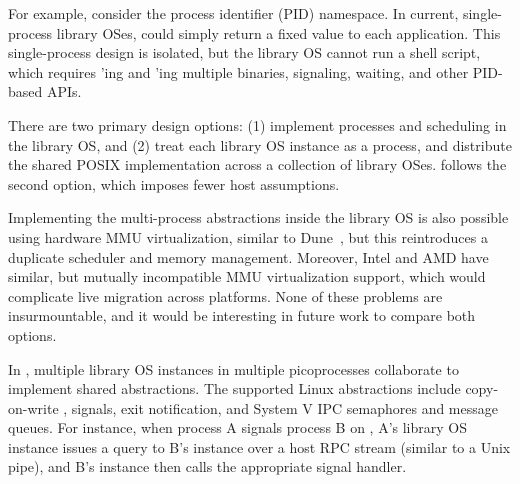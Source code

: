 
For example, consider the process identifier (PID) namespace. In current, single-process library OSes,  could simply return a fixed value to each application.
This single-process design is isolated, but the library OS cannot run a shell script, which requires 'ing and 'ing multiple binaries, signaling, waiting, and other PID-based APIs.

\vspace{5pt}
There are two primary design options: (1) implement processes and scheduling in 
the library OS, and (2) treat each library OS instance as a process, and distribute the shared POSIX implementation across a collection of library OSes.
\graphene{} follows the second option, which imposes fewer host assumptions.

Implementing the multi-process abstractions
inside the library OS is also possible using 
hardware MMU virtualization, similar to Dune~\cite{belay12dune},
but this reintroduces a duplicate scheduler and memory management.
Moreover, Intel and AMD have similar, but mutually incompatible MMU virtualization support,
which would complicate live migration across platforms.
None of these problems are insurmountable, and it would be interesting in future
work to compare both options.


In \graphene{}, multiple library OS instances in multiple picoprocesses collaborate to implement shared abstractions. The supported Linux abstractions include copy-on-write , signals, exit notification, and System V IPC semaphores and message queues.
For instance, when process A signals process B on \graphene{}, A's library OS instance issues a query to B's instance over a host RPC stream (similar to a Unix pipe), and B's instance then calls the appropriate signal handler.

